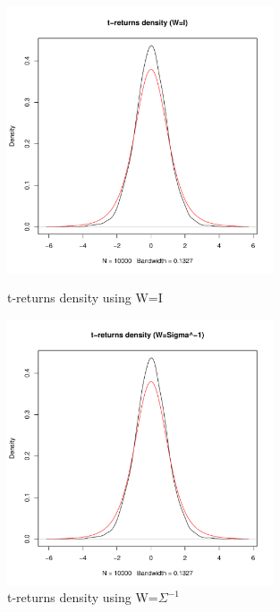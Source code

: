 \begin{figure}\label{t-returns_density}
    \centering
    \includegraphics[width=0.7\textwidth]{t-returns_density_(W=I).pdf}
    \caption{t-returns density using W=I}
    \includegraphics[width=0.7\textwidth]{t-returns_density_(W=Sigma^-1).pdf}
    \caption{t-returns density using W=$\Sigma^{-1}$}
\end{figure}